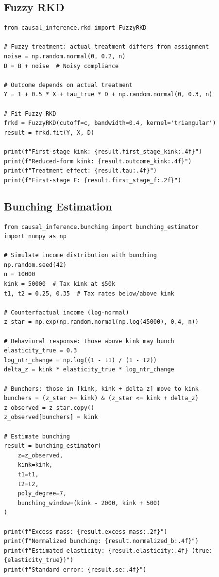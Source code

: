\subsection{Fuzzy RKD}

\begin{verbatim}
from causal_inference.rkd import FuzzyRKD

# Fuzzy treatment: actual treatment differs from assignment
noise = np.random.normal(0, 0.2, n)
D = B + noise  # Noisy compliance

# Outcome depends on actual treatment
Y = 1 + 0.5 * X + tau_true * D + np.random.normal(0, 0.3, n)

# Fit Fuzzy RKD
frkd = FuzzyRKD(cutoff=c, bandwidth=0.4, kernel='triangular')
result = frkd.fit(Y, X, D)

print(f"First-stage kink: {result.first_stage_kink:.4f}")
print(f"Reduced-form kink: {result.outcome_kink:.4f}")
print(f"Treatment effect: {result.tau:.4f}")
print(f"First-stage F: {result.first_stage_f:.2f}")
\end{verbatim}

\subsection{Bunching Estimation}

\begin{verbatim}
from causal_inference.bunching import bunching_estimator
import numpy as np

# Simulate income distribution with bunching
np.random.seed(42)
n = 10000
kink = 50000  # Tax kink at $50k
t1, t2 = 0.25, 0.35  # Tax rates below/above kink

# Counterfactual income (log-normal)
z_star = np.exp(np.random.normal(np.log(45000), 0.4, n))

# Behavioral response: those above kink may bunch
elasticity_true = 0.3
log_ntr_change = np.log((1 - t1) / (1 - t2))
delta_z = kink * elasticity_true * log_ntr_change

# Bunchers: those in [kink, kink + delta_z] move to kink
bunchers = (z_star >= kink) & (z_star <= kink + delta_z)
z_observed = z_star.copy()
z_observed[bunchers] = kink

# Estimate bunching
result = bunching_estimator(
    z=z_observed,
    kink=kink,
    t1=t1,
    t2=t2,
    poly_degree=7,
    bunching_window=(kink - 2000, kink + 500)
)

print(f"Excess mass: {result.excess_mass:.2f}")
print(f"Normalized bunching: {result.normalized_b:.4f}")
print(f"Estimated elasticity: {result.elasticity:.4f} (true: {elasticity_true})")
print(f"Standard error: {result.se:.4f}")
\end{verbatim}

